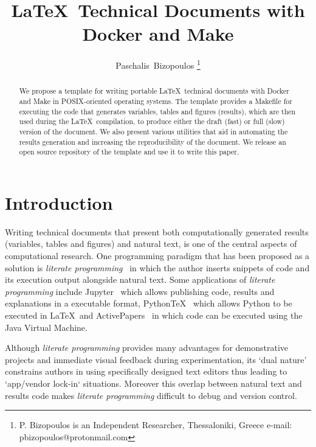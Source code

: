 \documentclass[journal]{IEEEtran}
\begin{document}

\title{\LaTeX\ Technical Documents with Docker and Make}

\author{Paschalis~Bizopoulos
\thanks{P. Bizopoulos is an Independent Researcher, Thessaloniki, Greece e-mail: pbizopoulos@protonmail.com}}

\maketitle

\begin{abstract}
	We propose a template for writing portable \LaTeX\ technical documents with Docker and Make in POSIX-oriented operating systems.
	The template provides a Makefile for executing the code that generates variables, tables and figures (results), which are then used during the \LaTeX\ compilation, to produce either the draft (fast) or full (slow) version of the document.
	We also present various utilities that aid in automating the results generation and increasing the reproducibility of the document.
	We release an open source repository of the template and use it to write this paper.
\end{abstract}

\section{Introduction}
Writing technical documents that present both computationally generated results (variables, tables and figures) and natural text, is one of the central aspects of computational research.
One programming paradigm that has been proposed as a solution is \textit{literate programming}~\cite{knuth1984literate} in which the author inserts snippets of code and its execution output alongside natural text.
Some applications of \textit{literate programming} include Jupyter~\cite{kluyver2016jupyter} which allows publishing code, results and explanations in a executable format, PythonTeX~\cite{poore2015pythontex} which allows Python to be executed in \LaTeX\ and ActivePapers~\cite{hinsen2014activepapers} in which code can be executed using the Java Virtual Machine.

Although \textit{literate programming} provides many advantages for demonstrative projects and immediate visual feedback during experimentation, its `dual nature' constrains authors in using specifically designed text editors thus leading to `app/vendor lock-in` situations.
Moreover this overlap between natural text and results code makes \textit{literate programming} difficult to debug and version control.
\end{document}
